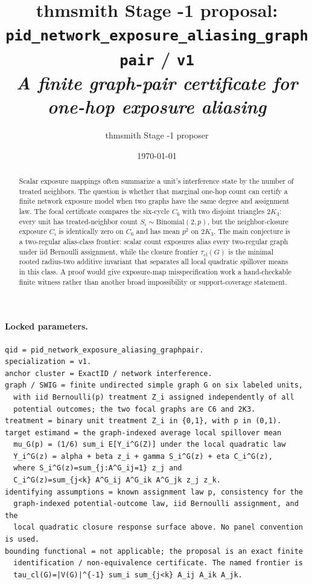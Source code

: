 \documentclass[11pt]{article}
\title{thmsmith Stage -1 proposal: \texttt{pid\_network\_exposure\_aliasing\_graphpair} / \texttt{v1}%
  \\ \large\textit{A finite graph-pair certificate for one-hop exposure aliasing}}
\author{thmsmith Stage -1 proposer}
\date{\today}
\theoremstyle{definition}
\theoremstyle{plain}
\theoremstyle{remark}
\begin{document}
\maketitle


\paragraph{Locked parameters.}
\begin{verbatim}
qid = pid_network_exposure_aliasing_graphpair.
specialization = v1.
anchor cluster = ExactID / network interference.
graph / SWIG = finite undirected simple graph G on six labeled units,
  with iid Bernoulli(p) treatment Z_i assigned independently of all
  potential outcomes; the two focal graphs are C6 and 2K3.
treatment = binary unit treatment Z_i in {0,1}, with p in (0,1).
target estimand = the graph-indexed average local spillover mean
  mu_G(p) = (1/6) sum_i E[Y_i^G(Z)] under the local quadratic law
  Y_i^G(z) = alpha + beta z_i + gamma S_i^G(z) + eta C_i^G(z),
  where S_i^G(z)=sum_{j:A^G_ij=1} z_j and
  C_i^G(z)=sum_{j<k} A^G_ij A^G_ik A^G_jk z_j z_k.
identifying assumptions = known assignment law p, consistency for the
  graph-indexed potential-outcome law, iid Bernoulli assignment, and the
  local quadratic closure response surface above. No panel convention is used.
bounding functional = not applicable; the proposal is an exact finite
  identification / non-equivalence certificate. The named frontier is
  tau_cl(G)=|V(G)|^{-1} sum_i sum_{j<k} A_ij A_ik A_jk.
\end{verbatim}

\begin{abstract}
Scalar exposure mappings often summarize a unit's interference state by the number of treated neighbors. The question is whether that marginal one-hop count can certify a finite network exposure model when two graphs have the same degree and assignment law. The focal certificate compares the six-cycle \(C_6\) with two disjoint triangles \(2K_3\): every unit has treated-neighbor count \(S_i \sim \mathrm{Binomial}(2,p)\), but the neighbor-closure exposure \(C_i\) is identically zero on \(C_6\) and has mean \(p^2\) on \(2K_3\). The main conjecture is a two-regular alias-class frontier: scalar count exposures alias every two-regular graph under iid Bernoulli assignment, while the closure frontier \(\tau_{\mathrm{cl}}(G)\) is the minimal rooted radius-two additive invariant that separates all local quadratic spillover means in this class. A proof would give exposure-map misspecification work a hand-checkable finite witness rather than another broad impossibility or support-coverage statement.
\end{abstract}
\end{document}

